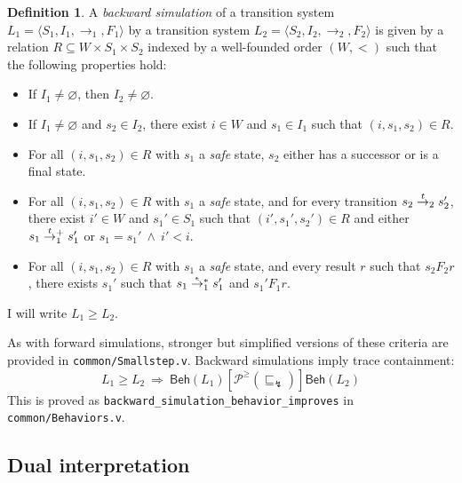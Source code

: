 \documentclass[11pt,oneside]{book}
\theoremstyle{definition}
\newtheorem{definition}[theorem]{Definition}
\newcommand{\kw}[1]{\ensuremath{ \mathsf{#1} }}
\newcommand{\ifr}[1]{\mathrel{[{#1}]}}
\newcommand{\refby}{\sqsubseteq} %
\begin{document}
\begin{definition} %
A \emph{backward simulation}
of a transition system
$L_1 = \langle S_1, I_1, {\rightarrow}_1, F_1 \rangle$
by a transition system
$L_2 = \langle S_2, I_2, {\rightarrow}_2, F_2 \rangle$
is given by a relation $R \subseteq W \times S_1 \times S_2$
indexed by a well-founded order $(W, {<})$
such that the following properties hold:
\begin{itemize}
  \item If $I_1 \ne \varnothing$, then $I_2 \ne \varnothing$.
  \item If $I_1 \ne \varnothing$ and $s_2 \in I_2$,
    there exist $i \in W$ and $s_1 \in I_1$
    such that $(i, s_1, s_2) \in R$.
  \item For all $(i, s_1, s_2) \in R$
    with $s_1$ a \emph{safe} state,
    $s_2$ either has a successor or
    is a final state.
  \item For all $(i, s_1, s_2) \in R$
    with $s_1$ a \emph{safe} state,
    and for every transition
    $s_2 \mathrel{\smash{\stackrel{t}{\rightarrow}}_2} s_2'$,
    there exist $i' \in W$ and $s_1' \in S_1$
    such that $(i', s_1', s_2') \in R$ and either
    $s_1 \mathrel{\smash{\stackrel{t}{\rightarrow}}_1^+} s_1'$ or
    $s_1 = s_1' \:\wedge\: i' < i$.
  \item For all $(i, s_1, s_2) \in R$
    with $s_1$ a \emph{safe} state,
    and every result $r$ such that $s_2 \mathrel{F_2} r$,
    there exists $s_1'$ such that
    $s_1 \mathrel{\smash{\stackrel{\epsilon}{\rightarrow}}_1^*} s_1'$ and
    $s_1' \mathrel{F_1} r$.
\end{itemize}
I will write $L_1 \ge L_2$.
\end{definition}

As with forward simulations,
stronger but simplified versions
of these criteria
are provided in \texttt{common/Smallstep.v}.
Backward simulations imply trace containment:
\[
  L_1 \ge L_2
  \: \Rightarrow \:
  \kw{Beh}(L_1) \ifr{\mathcal{P}^\ge(\refby_\lightning)} \kw{Beh}(L_2)
\]
This is proved as \texttt{backward\_simulation\_behavior\_improves}
in \texttt{common/Behaviors.v}.


\subsection{Dual interpretation} %
\end{document}
